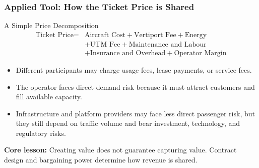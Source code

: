 \documentclass{beamer}
\begin{document}
\begin{frame}[t, shrink=10]
  \frametitle{Applied Tool: How the Ticket Price is Shared}
  \begin{block}{A Simple Price Decomposition}
  \[
  \begin{split}
  \text{Ticket Price}={}&\text{Aircraft Cost}+\text{Vertiport Fee}+\text{Energy}\\
  &+\text{UTM Fee}+\text{Maintenance and Labour}\\
  &+\text{Insurance and Overhead}+\text{Operator Margin}
  \end{split}
  \]
  \end{block}
  \begin{itemize}
    \item Different participants may charge usage fees, lease payments, or service fees.
    \item The operator faces direct demand risk because it must attract customers and fill available capacity.
    \item Infrastructure and platform providers may face less direct passenger risk, but they still depend on traffic volume and bear investment, technology, and regulatory risks.
  \end{itemize}
  \textbf{Core lesson:} Creating value does not guarantee capturing value. Contract design and bargaining power determine how revenue is shared.
\end{frame}
\end{document}
